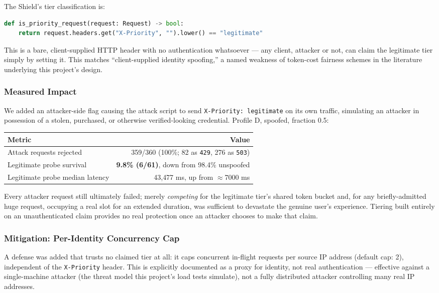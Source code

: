 \documentclass[11pt]{article}
\begin{document}
The Shield's tier classification is:
\begin{lstlisting}[language=Python]
def is_priority_request(request: Request) -> bool:
    return request.headers.get("X-Priority", "").lower() == "legitimate"
\end{lstlisting}
This is a bare, client-supplied HTTP header with no authentication whatsoever
--- any client, attacker or not, can claim the legitimate tier simply by
setting it. This matches ``client-supplied identity spoofing,'' a named
weakness of token-cost fairness schemes in the literature underlying this
project's design.

\subsubsection{Measured Impact}

We added an attacker-side flag causing the attack script to send
\texttt{X-Priority: legitimate} on its own traffic, simulating an attacker in
possession of a stolen, purchased, or otherwise verified-looking credential.
Profile D, spoofed, fraction 0.5:

\begin{center}
\begin{tabular}{lr}
\toprule
Metric & Value \\
\midrule
Attack requests rejected & 359/360 (100\%; 82 as \texttt{429}, 276 as \texttt{503}) \\
Legitimate probe survival & \textbf{9.8\% (6/61)}, down from 98.4\% unspoofed \\
Legitimate probe median latency & 43{,}477 ms, up from $\approx$7000 ms \\
\bottomrule
\end{tabular}
\end{center}

Every attacker request still ultimately failed; merely \emph{competing} for
the legitimate tier's shared token bucket and, for any briefly-admitted huge
request, occupying a real slot for an extended duration, was sufficient to
devastate the genuine user's experience. Tiering built entirely on an
unauthenticated claim provides no real protection once an attacker chooses to
make that claim.

\subsubsection{Mitigation: Per-Identity Concurrency Cap}

A defense was added that trusts no claimed tier at all: it caps concurrent
in-flight requests per source IP address (default cap: 2), independent of the
\texttt{X-Priority} header. This is explicitly documented as a proxy for
identity, not real authentication --- effective against a single-machine
attacker (the threat model this project's load tests simulate), not a fully
distributed attacker controlling many real IP addresses.
\end{document}
